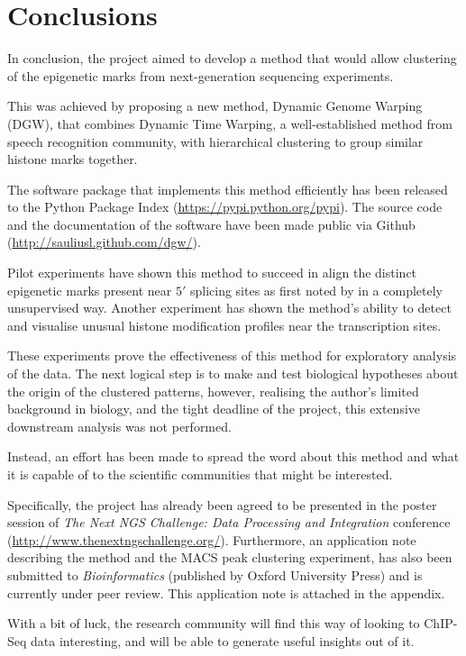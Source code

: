 \documentclass[parskip]{cs4rep}
\begin{document}
\chapter{Conclusions}

In conclusion, the project aimed to develop a method that would allow clustering of the epigenetic marks from next-generation sequencing experiments.

This was achieved by proposing a new method, Dynamic Genome Warping (DGW), that combines Dynamic Time Warping, a well-established method from speech recognition community, with hierarchical clustering to group similar histone marks together.

The software package that implements this method efficiently has been released to the Python Package Index (\url{https://pypi.python.org/pypi}). The source code and the documentation of the software have been made public via Github (\url{http://sauliusl.github.com/dgw/}).

Pilot experiments have shown this method to succeed in align the distinct epigenetic marks present near $5'$ splicing sites as first noted by \cite{Bieberstein:2012tf} in a completely unsupervised way.
Another experiment has shown the method's ability to detect and visualise unusual histone modification profiles near the transcription sites.

These experiments prove the effectiveness of this method for exploratory analysis of the data.
The next logical step is to make and test biological hypotheses about the origin of the clustered patterns, 
however, realising the author's limited background in biology, and the tight deadline of the project, this extensive downstream analysis was not performed. 

Instead, an effort has been made to spread the word about this method and what it is capable of to the scientific communities that might be interested.

Specifically, the project has already been agreed to be presented in the poster session of \emph{The Next NGS Challenge: Data Processing and Integration} conference (\url{http://www.thenextngschallenge.org/}). Furthermore, an application note describing the method and the MACS peak clustering experiment, has also been submitted to \emph{Bioinformatics} (published by Oxford University Press) and is currently under peer review. This application note is attached in the appendix.

With a bit of luck, the research community will find this way of looking to ChIP-Seq data interesting, and will be able to generate useful insights out of it. 
\end{document}
